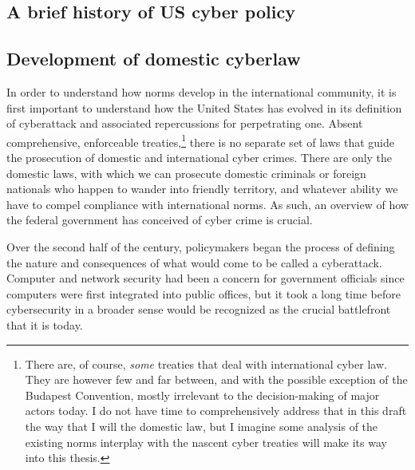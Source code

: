 \documentclass{report}
\begin{document}
\begin{refsegment}
\section{A brief history of US cyber policy}
\subsection{Development of domestic cyberlaw}
In order to understand how norms develop in the international community, it is first important to understand how the United States has evolved in its definition of cyberattack and associated repercussions for perpetrating one. Absent comprehensive, enforceable treaties,\footnote{There are, of course, \emph{some} treaties that deal with international cyber law. They are however few and far between, and with the possible exception of the Budapest Convention, mostly irrelevant to the decision-making of major actors today. I do not have time to comprehensively address that in this draft the way that I will the domestic law, but I imagine some analysis of the existing norms interplay with the nascent cyber treaties will make its way into this thesis.} there is no separate set of laws that guide the prosecution of domestic and international cyber crimes. There are only the domestic laws, with which we can prosecute domestic criminals or foreign nationals who happen to wander into friendly territory, and whatever ability we have to compel compliance with international norms. As such, an overview of how the federal government has conceived of cyber crime is crucial.

Over the second half of the  century, policymakers began the process of defining the nature and consequences of what would come to be called a cyberattack. Computer and network security had been a concern for government officials since computers were first integrated into public offices, but it took a long time before cybersecurity in a broader sense would be recognized as the crucial battlefront that it is today.


\end{refsegment}
\end{document}
